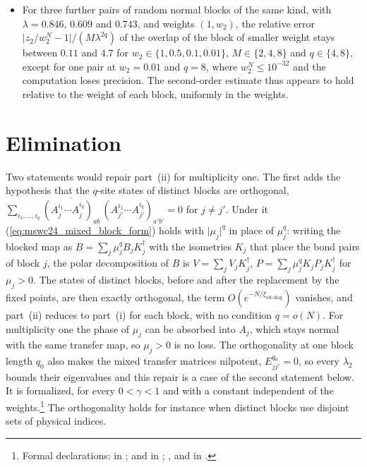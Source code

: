 \documentclass{article}
\begin{document}
\begin{itemize}
          $q\in\{4,6,8,10\}$, and for the counterexample it is $0.125$ at $M=4,16$ and
          $q=6,8,10$, the value $Ms^2/8$, in agreement with
          (\ref{eq:mswc24_mixed_second_order}).
    \item For three further pairs of random normal blocks of the same kind, with
          $\lambda=0.846$, $0.609$ and $0.743$, and weights $(1,w_2)$, the relative error
          $\lvert z_2/w_2^N-1\rvert/(M\lambda^{2q})$ of the overlap of the block of smaller weight
          stays between $0.11$ and $4.7$ for $w_2\in\{1,0.5,0.1,0.01\}$, $M\in\{2,4,8\}$ and
          $q\in\{4,8\}$, except for one pair at $w_2=0.01$ and $q=8$, where $w_2^N\leq10^{-32}$
          and the computation loses precision. The second-order estimate thus appears to hold relative to the weight
          of each block, uniformly in the weights.
\end{itemize}

\section{Elimination}
Two statements would repair part~(ii) for multiplicity one. The first adds the
hypothesis that the $q$-site states of distinct blocks are orthogonal,
$\sum_{i_1,\dots,i_q}\overline{(A_j^{i_1}\cdots A_j^{i_q})_{ab}}\,
    (A_{j'}^{i_1}\cdots A_{j'}^{i_q})_{a'b'}=0$ for $j\neq j'$. Under it
(\ref{eq:mswc24_mixed_block_form}) holds with $\lvert\mu_j\rvert^q$ in place of
$\mu_j^q$: writing the blocked map as $B=\sum_j\mu_j^qB_jK_j^\dagger$ with the
isometries $K_j$ that place the bond pairs of block $j$, the polar decomposition of
$B$ is $V=\sum_jV_jK_j^\dagger$, $P=\sum_j\mu_j^qK_jP_jK_j^\dagger$ for $\mu_j>0$.
The states of distinct blocks, before and after the replacement by the fixed
points, are then exactly orthogonal, the term $O(e^{-N/\xi_{\mathrm{off\text{-}diag}}})$
vanishes, and part~(ii) reduces to part~(i) for each block, with no condition
$q=o(N)$. For multiplicity one the phase of $\mu_j$ can be absorbed into $A_j$,
which stays normal with the same transfer map, so $\mu_j>0$ is no loss. The orthogonality
at one block length $q_0$ also makes the mixed transfer matrices nilpotent,
$E_{jj'}^{q_0}=0$, so every $\lambda_2$ bounds their eigenvalues and this repair is a case of the
second statement below. It is formalized, for every $0<\gamma<1$ and with a constant
independent of the weights.\footnote{Formal declarations:
     in
    ;
     and
     in
    ;
    ,
     and
     in
    .}
The orthogonality holds for instance when distinct blocks use disjoint sets of
physical indices.
\end{document}
